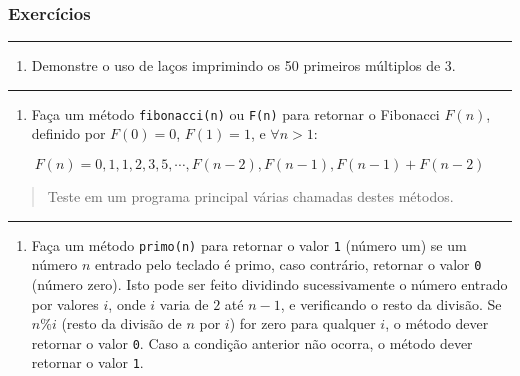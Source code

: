\documentclass[12pt,a4paper]{article}
\renewcommand{\linethickness}{0.05em}
\providecommand{\tightlist}{%
      \setlength{\itemsep}{0pt}\setlength{\parskip}{0pt}}
\begin{document}
    \hypertarget{exercuxedcios}{%
\subsubsection{Exercícios}\label{exercuxedcios}}

    \begin{center}\rule{0.5\linewidth}{\linethickness}\end{center}

\begin{enumerate}
\def\labelenumi{\arabic{enumi}.}
\tightlist
\item
  Demonstre o uso de laços imprimindo os 50 primeiros múltiplos de 3.
\end{enumerate}

    \begin{center}\rule{0.5\linewidth}{\linethickness}\end{center}

\begin{enumerate}
\def\labelenumi{\arabic{enumi}.}
\setcounter{enumi}{1}
\tightlist
\item
  Faça um método \texttt{fibonacci(n)} ou \texttt{F(n)} para retornar o
  Fibonacci \(F(n)\), definido por \(F(0)=0\), \(F(1)=1\), e
  \(\forall n>1\):
\end{enumerate}

\[F(n) = 0, 1, 1, 2, 3, 5, \cdots, F(n-2), F(n-1), F(n-1) + F(n-2) \]

\begin{quote}
Teste em um programa principal várias chamadas destes métodos.
\end{quote}

    \begin{center}\rule{0.5\linewidth}{\linethickness}\end{center}

\begin{enumerate}
\def\labelenumi{\arabic{enumi}.}
\setcounter{enumi}{2}
\tightlist
\item
  Faça um método \texttt{primo(n)} para retornar o valor \texttt{1}
  (número um) se um número \(n\) entrado pelo teclado é primo, caso
  contrário, retornar o valor \texttt{0} (número zero). Isto pode ser
  feito dividindo sucessivamente o número entrado por valores \(i\),
  onde \(i\) varia de \(2\) até \(n-1\), e verificando o resto da
  divisão. Se \(n\%i\) (resto da divisão de \(n\) por \(i\)) for zero
  para qualquer \(i\), o método dever retornar o valor \texttt{0}. Caso
  a condição anterior não ocorra, o método dever retornar o valor
  \texttt{1}.
\end{enumerate}
\end{document}
